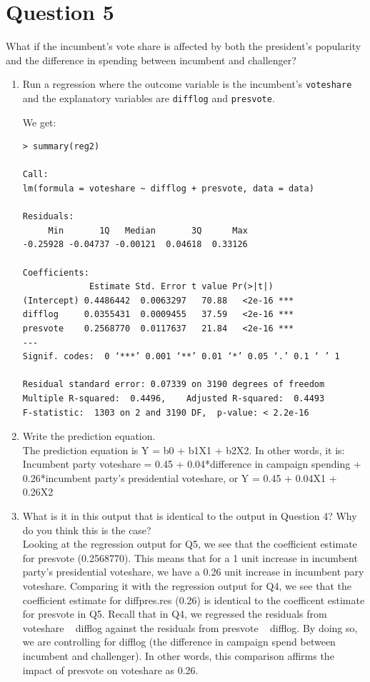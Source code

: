 \documentclass[12pt,letterpaper]{article}
\begin{document}
\section*{Question 5}
\noindent What if the incumbent's vote share is affected by both the president's popularity and the difference in spending between incumbent and challenger? 
	\begin{enumerate}
		\item Run a regression where the outcome variable is the incumbent's \texttt{voteshare} and the explanatory variables are \texttt{difflog} and \texttt{presvote}.	
\vspace{.5cm}
  
\vspace{.5cm}  
\noindent We get:\\
\begin{verbatim}
> summary(reg2)

Call:
lm(formula = voteshare ~ difflog + presvote, data = data)

Residuals:
     Min       1Q   Median       3Q      Max 
-0.25928 -0.04737 -0.00121  0.04618  0.33126 

Coefficients:
             Estimate Std. Error t value Pr(>|t|)    
(Intercept) 0.4486442  0.0063297   70.88   <2e-16 ***
difflog     0.0355431  0.0009455   37.59   <2e-16 ***
presvote    0.2568770  0.0117637   21.84   <2e-16 ***
---
Signif. codes:  0 ‘***’ 0.001 ‘**’ 0.01 ‘*’ 0.05 ‘.’ 0.1 ‘ ’ 1

Residual standard error: 0.07339 on 3190 degrees of freedom
Multiple R-squared:  0.4496,	Adjusted R-squared:  0.4493 
F-statistic:  1303 on 2 and 3190 DF,  p-value: < 2.2e-16
\end{verbatim}
		\item Write the prediction equation.\\
\noindent The prediction equation is Y = b0 + b1X1 + b2X2. In other words, it is: Incumbent party voteshare = 0.45 + 0.04*difference in campaign spending + 0.26*incumbent party's presidential voteshare, or Y = 0.45 + 0.04X1 + 0.26X2\\
		\item What is it in this output that is identical to the output in Question 4? Why do you think this is the case?\\
\noindent Looking at the regression output for Q5, we see that the coefficient estimate for presvote (0.2568770). This means that for a 1 unit increase in incumbent party's presidential voteshare, we have a 0.26 unit increase in incumbent pary voteshare. Comparing it with the regression output for Q4, we see that the coefficient estimate for diffpres.res (0.26) is identical to the coefficent estimate for presvote in Q5. Recall that in Q4, we regressed the residuals from voteshare ~ difflog against the residuals from presvote ~ difflog. By doing so, we are controlling for difflog (the difference in campaign spend between incumbent and challenger). In other words, this  comparison affirms the impact of presvote on voteshare as 0.26.\\
	\end{enumerate}
\end{document}
